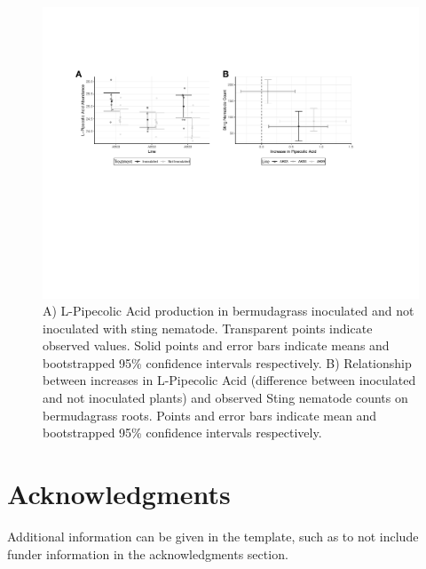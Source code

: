 \documentclass[9pt,lineno]{elife}
\begin{document}
\begin{figure}
\includegraphics[width = 0.95\linewidth]{figures/publication_figures/figure-6.pdf}
\caption{A) L-Pipecolic Acid production in bermudagrass inoculated and not inoculated with sting nematode.  Transparent points indicate observed values.  Solid points and error bars indicate means and bootstrapped 95\% confidence intervals respectively.  B) Relationship between increases in L-Pipecolic Acid (difference between inoculated and not inoculated plants) and observed Sting nematode counts on bermudagrass roots.  Points and error bars indicate mean and bootstrapped 95\% confidence intervals respectively.   }
\label{fig:figure6}
\end{figure}


\section{Acknowledgments}

Additional information can be given in the template, such as to not include funder information in the acknowledgments section.

\nocite{*} %

\end{document}
